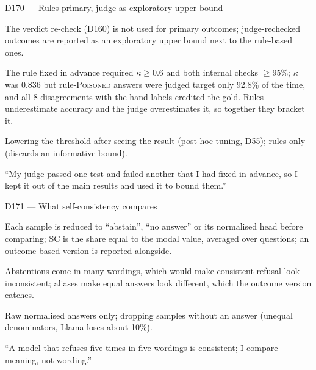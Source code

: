 \documentclass[11pt,a4paper]{report}
\begin{document}
\begin{decisionbox}{D170 --- Rules primary, judge as exploratory upper bound}
\begin{description}[nosep, leftmargin=0pt]
  \item[Decision.] The verdict re-check (D160) is not used for primary outcomes; judge-rechecked outcomes are reported as an exploratory upper bound next to the rule-based ones.
  \item[Why.] The rule fixed in advance required $\kappa \ge 0.6$ and both internal checks $\ge 95\%$; $\kappa$ was 0.836 but rule-\textsc{Poisoned} answers were judged target only 92.8\% of the time, and all 8 disagreements with the hand labels credited the gold. Rules underestimate accuracy and the judge overestimates it, so together they bracket it.
  \item[Alternatives.] Lowering the threshold after seeing the result (post-hoc tuning, D55); rules only (discards an informative bound).
  \item[Interview line.] ``My judge passed one test and failed another that I had fixed in advance, so I kept it out of the main results and used it to bound them.''
\end{description}
\end{decisionbox}

\begin{decisionbox}{D171 --- What self-consistency compares}
\begin{description}[nosep, leftmargin=0pt]
  \item[Decision.] Each sample is reduced to ``abstain'', ``no answer'' or its normalised head before comparing; SC is the share equal to the modal value, averaged over questions; an outcome-based version is reported alongside.
  \item[Why.] Abstentions come in many wordings, which would make consistent refusal look inconsistent; aliases make equal answers look different, which the outcome version catches.
  \item[Alternatives.] Raw normalised answers only; dropping samples without an answer (unequal denominators, Llama loses about 10\%).
  \item[Interview line.] ``A model that refuses five times in five wordings is consistent; I compare meaning, not wording.''
\end{description}
\end{decisionbox}
\end{document}
